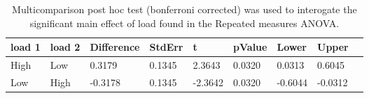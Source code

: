 \begin{table}
\centering
\begin{tabular}[0.2em]{@{}lllllllll@{}}\toprule
load 1 & load 2 & Difference & StdErr & t & pValue & Lower & Upper\\\toprule[0.2em]
High & Low & 0.3179 & 0.1345 & 2.3643 & 0.0320 & 0.0313 & 0.6045 \\\midrule
Low & High & -0.3178 & 0.1345 & -2.3642 & 0.0320 & -0.6044 & -0.0312 \\\bottomrule[0.2em]
\end{tabular}
\caption{Multicomparison post hoc test (bonferroni corrected) was used to interogate the significant main effect of load found in the Repeated measures ANOVA.\label{tabel:tbl_RMABA2_PH_load}}
\end{table}
